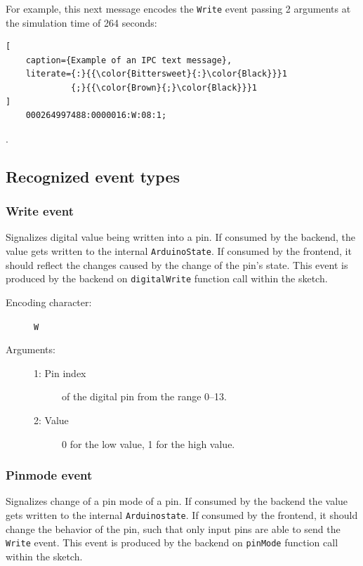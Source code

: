 For example, this next message encodes the \texttt{Write} event passing 2 arguments at the simulation time of 264 seconds:

\begin{lstlisting}[
    caption={Example of an IPC text message},
    literate={:}{{\color{Bittersweet}{:}\color{Black}}}1
             {;}{{\color{Brown}{;}\color{Black}}}1
]
    000264997488:0000016:W:08:1;
\end{lstlisting}

.

\subsection{Recognized event types}

\subsubsection{Write event}
Signalizes digital value being written into a pin. If consumed by the backend, the value gets written to the internal \texttt{ArduinoState}. If consumed by the frontend, it should reflect the changes caused by the change of the pin's state. This event is produced by the backend on \texttt{digitalWrite} function call within the sketch.

\begin{description}
    \item[Encoding character:] \texttt{W}
    \item[Arguments:] \hfill
    \begin{description}
        \item[1: Pin index] of the digital pin from the range 0--13.
        \item[2: Value] 0 for the low value, 1 for the high value.
    \end{description}
\end{description}

\subsubsection{Pinmode event}
Signalizes change of a pin mode of a pin. If consumed by the backend the value gets written to the internal \texttt{Arduinostate}. If consumed by the frontend, it should change the behavior of the pin, such that only input pins are able to send the \texttt{Write} event. This event is produced by the backend on \texttt{pinMode} function call within the sketch.

